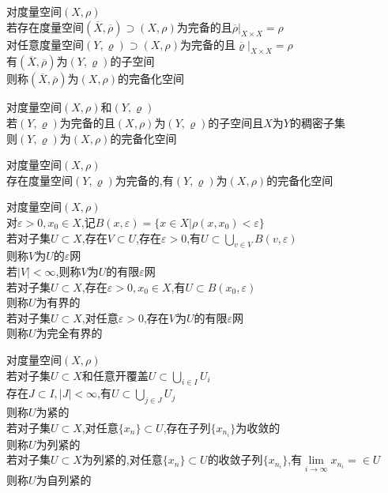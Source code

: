 \begin{dingyi}
对度量空间$(X,\rho)$\\
若存在度量空间$(\overline{X},\overline{\rho})\supset (X,\rho)$为完备的且$\overline{\rho}|_{X\times X}=\rho$\\
对任意度量空间$(Y,\varrho)\supset (X,\rho)$为完备的且$\overline{\varrho}|_{X\times X}=\rho$\\
有$(\overline{X},\overline{\rho})$为$(Y,\varrho)$的子空间\\
则称$(\overline{X},\overline{\rho})$为$(X,\rho)$的完备化空间
\end{dingyi}

\begin{dingli}
对度量空间$(X,\rho)$和$(Y,\varrho)$\\
若$(Y,\varrho)$为完备的且$(X,\rho)$为$(Y,\varrho)$的子空间且$X$为$Y$的稠密子集\\
则$(Y,\varrho)$为$(X,\rho)$的完备化空间
\end{dingli}

\begin{dingli}
对度量空间$(X,\rho)$\\
存在度量空间$(Y,\varrho)$为完备的,有$(Y,\varrho)$为$(X,\rho)$的完备化空间
\end{dingli}

\begin{dingyi}
对度量空间$(X,\rho)$\\
对$\varepsilon>0,x_0\in X$,记$B(x,\varepsilon)=\{x\in X|\rho(x,x_0)<\varepsilon\}$\\
若对子集$U\subset X$,存在$V\subset U$,存在$\varepsilon>0$,有$U\subset \bigcup\limits_{v\in V}B(v,\varepsilon)$\\
则称$V$为$U$的$\varepsilon$网\\
若$|V|<\infty$,则称$V$为$U$的有限$\varepsilon$网\\
若对子集$U\subset X$,存在$\varepsilon>0,x_0\in X$,有$U\subset B(x_0,\varepsilon)$\\
则称$U$为有界的\\
若对子集$U\subset X$,对任意$\varepsilon>0$,存在$V$为$U$的有限$\varepsilon$网\\
则称$U$为完全有界的
\end{dingyi}

\begin{dingyi}
对度量空间$(X,\rho)$\\
若对子集$U\subset X$和任意开覆盖$U\subset \bigcup\limits_{i\in I}U_{i}$\\
存在$J\subset I,|J|<\infty$,有$U\subset \bigcup\limits_{j\in J}U_{j}$\\
则称$U$为紧的\\
若对子集$U\subset X$,对任意$\{x_n\}\subset U$,存在子列$\{x_{n_i}\}$为收敛的\\
则称$U$为列紧的\\
若对子集$U\subset X$为列紧的,对任意$\{x_n\}\subset U$的收敛子列$\{x_{n_i}\}$,有$\lim\limits_{i\to\infty}x_{n_i}=\in U$\\
则称$U$为自列紧的
\end{dingyi}

